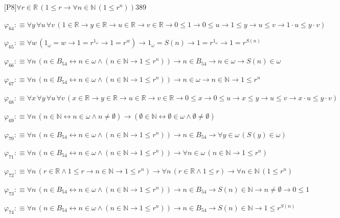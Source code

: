 \begin{fullproof}{[P8]}{$\forall r \in \mathbb{R}\,(1 \leq r \to \forall n \in \mathbb{N}\,(1 \leq {{r}^{n}}))$}{389}
\begin{abbrevlist}
\item $\varphi_{64} :\equiv \forall y\,\forall u\,\forall v\,(1 \in \mathbb{R} \to y \in \mathbb{R} \to u \in \mathbb{R} \to v \in \mathbb{R} \to 0 \leq 1 \to 0 \leq u \to 1 \leq y \to u \leq v \to 1 \cdot u \leq y \cdot v)$
\item $\varphi_{65} :\equiv \forall w\,(1_{\omega} = w \to 1 = {{r}^{1_{\omega}}} \to 1 = {{r}^{w}}) \to 1_{\omega} = S(n) \to 1 = {{r}^{1_{\omega}}} \to 1 = {{r}^{S(n)}}$
\item $\varphi_{66} :\equiv \forall n\,(n \in B_{54} \leftrightarrow n \in \omega \land (n \in \mathbb{N} \to 1 \leq {{r}^{n}})) \to n \in B_{54} \to n \in \omega \to S(n) \in \omega$
\item $\varphi_{67} :\equiv \forall n\,(n \in B_{54} \leftrightarrow n \in \omega \land (n \in \mathbb{N} \to 1 \leq {{r}^{n}})) \to n \in \omega \to n \in \mathbb{N} \to 1 \leq {{r}^{n}}$
\item $\varphi_{68} :\equiv \forall x\,\forall y\,\forall u\,\forall v\,(x \in \mathbb{R} \to y \in \mathbb{R} \to u \in \mathbb{R} \to v \in \mathbb{R} \to 0 \leq x \to 0 \leq u \to x \leq y \to u \leq v \to x \cdot u \leq y \cdot v)$
\item $\varphi_{69} :\equiv \forall n\,(n \in \mathbb{N} \leftrightarrow n \in \omega \land n \neq \emptyset) \to (\emptyset \in \mathbb{N} \leftrightarrow \emptyset \in \omega \land \emptyset \neq \emptyset)$
\item $\varphi_{70} :\equiv \forall n\,(n \in B_{54} \leftrightarrow n \in \omega \land (n \in \mathbb{N} \to 1 \leq {{r}^{n}})) \to n \in B_{54} \to \forall y \in \omega\,(S(y) \in \omega)$
\item $\varphi_{71} :\equiv \forall n\,(n \in B_{54} \leftrightarrow n \in \omega \land (n \in \mathbb{N} \to 1 \leq {{r}^{n}})) \to \forall n \in \omega\,(n \in \mathbb{N} \to 1 \leq {{r}^{n}})$
\item $\varphi_{72} :\equiv \forall n\,(r \in \mathbb{R} \land 1 \leq r \to n \in \mathbb{N} \to 1 \leq {{r}^{n}}) \to \forall n\,(r \in \mathbb{R} \land 1 \leq r) \to \forall n \in \mathbb{N}\,(1 \leq {{r}^{n}})$
\item $\varphi_{73} :\equiv \forall n\,(n \in B_{54} \leftrightarrow n \in \omega \land (n \in \mathbb{N} \to 1 \leq {{r}^{n}})) \to n \in B_{54} \to S(n) \in \mathbb{N} \to n \neq \emptyset \to 0 \leq 1$
\item $\varphi_{74} :\equiv \forall n\,(n \in B_{54} \leftrightarrow n \in \omega \land (n \in \mathbb{N} \to 1 \leq {{r}^{n}})) \to n \in B_{54} \to S(n) \in \mathbb{N} \to 1 \leq {{r}^{S(n)}}$

\end{abbrevlist}
\end{fullproof}
